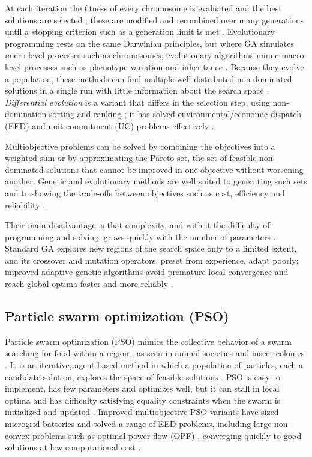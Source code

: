 \documentclass[final,3p,times]{elsarticle}
\begin{document}
At each iteration the fitness of every chromosome is evaluated and the best solutions are selected \cite{pathak2017}; these are modified and recombined over many generations until a stopping criterion such as a generation limit is met \cite{nemati2015}. Evolutionary programming rests on the same Darwinian principles, but where GA simulates micro-level processes such as chromosomes, evolutionary algorithms mimic macro-level processes such as phenotype variation and inheritance \cite{pathak2017}. Because they evolve a population, these methods can find multiple well-distributed non-dominated solutions in a single run with little information about the search space \cite{Qu2018}. \textit{Differential evolution} is a variant that differs in the selection step, using non-domination sorting and ranking \cite{Qu2018}; it has solved environmental/economic dispatch (EED) and unit commitment (UC) problems effectively \cite{lu2011}.

Multiobjective problems can be solved by combining the objectives into a weighted sum or by approximating the Pareto set, the set of feasible non-dominated solutions that cannot be improved in one objective without worsening another. Genetic and evolutionary methods are well suited to generating such sets and to showing the trade-offs between objectives such as cost, efficiency and reliability \cite{fadaee2012}.

Their main disadvantage is that complexity, and with it the difficulty of programming and solving, grows quickly with the number of parameters \cite{fathima2015}. Standard GA explores new regions of the search space only to a limited extent, and its crossover and mutation operators, preset from experience, adapt poorly; improved adaptive genetic algorithms avoid premature local convergence and reach global optima faster and more reliably \cite{wu2016}.

\subsection{Particle swarm optimization (PSO) \label{app:pso}}

Particle swarm optimization (PSO) mimics the collective behavior of a swarm searching for food within a region \cite{fathima2015}, as seen in animal societies and insect colonies \cite{pathak2017}. It is an iterative, agent-based method in which a population of particles, each a candidate solution, explores the space of feasible solutions \cite{alrashidi2010}. PSO is easy to implement, has few parameters and optimizes well, but it can stall in local optima and has difficulty satisfying equality constraints when the swarm is initialized and updated \cite{wu2014}. Improved multiobjective PSO variants have sized microgrid batteries and solved a range of EED problems, including large non-convex problems such as optimal power flow (OPF) \cite{alrashidi2010}, converging quickly to good solutions at low computational cost \cite{pathak2017}.
\end{document}
